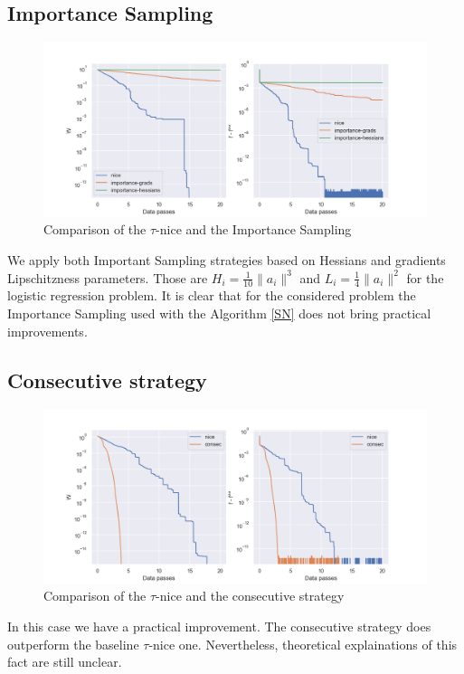 \documentclass{article}
\theoremstyle{definition}
\theoremstyle{assumption}
\theoremstyle{lemma}
\theoremstyle{theorem}
\theoremstyle{proposition}
\begin{document}
	\subsection{Importance Sampling}
	\begin{figure}[h!]\label{fig:2}
		\centering
		\includegraphics[width=\textwidth]{importance sampling}
		\caption{Comparison of the $\tau$-nice and the Importance Sampling}
	\end{figure}
	We apply both Important Sampling strategies based on Hessians and gradients Lipschitzness parameters. Those are $H_i = \frac{1}{10} \|a_i\|^3$ and $L_i = \frac{1}{4}\|a_i\|^2$ for the logistic regression problem. It is clear that for the considered problem the Importance Sampling used with the Algorithm \ref{SN} does not bring practical improvements.
	
	\subsection{Consecutive strategy}
	\begin{figure}[h!]\label{fig:3}
		\centering
		\includegraphics[width=\textwidth]{consecutive strategy 10}
		\caption{Comparison of the $\tau$-nice and the consecutive strategy}
	\end{figure}
	In this case we have a practical improvement. The consecutive strategy does outperform the baseline $\tau$-nice one. Nevertheless, theoretical explainations of this fact are still unclear.
	
\end{document}
